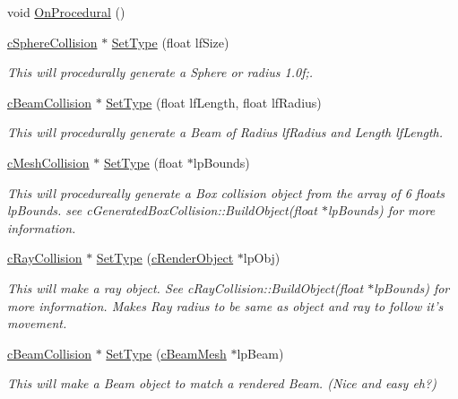 \begin{DoxyCompactItemize}
void \hyperlink{classc_collision_object_a6ea3e10f69f7a2d5cae2bd4471461137}{OnProcedural} ()
\item 
\hyperlink{classc_sphere_collision}{cSphereCollision} $\ast$ \hyperlink{classc_collision_object_a22e6f4f5c722b6d45629d92488e5d925}{SetType} (float lfSize)
\begin{DoxyCompactList}\small\item\em This will procedurally generate a Sphere or radius 1.0f;. \item\end{DoxyCompactList}\item 
\hyperlink{classc_beam_collision}{cBeamCollision} $\ast$ \hyperlink{classc_collision_object_ab5fc1f36d50ea87a69b4879076a92533}{SetType} (float lfLength, float lfRadius)
\begin{DoxyCompactList}\small\item\em This will procedurally generate a Beam of Radius lfRadius and Length lfLength. \item\end{DoxyCompactList}\item 
\hyperlink{classc_mesh_collision}{cMeshCollision} $\ast$ \hyperlink{classc_collision_object_a40b80411356222997bb94fae10796c93}{SetType} (float $\ast$lpBounds)
\begin{DoxyCompactList}\small\item\em This will procedureally generate a Box collision object from the array of 6 floats lpBounds. see cGeneratedBoxCollision::BuildObject(float $\ast$lpBounds) for more information. \item\end{DoxyCompactList}\item 
\hyperlink{classc_ray_collision}{cRayCollision} $\ast$ \hyperlink{classc_collision_object_a761dae3de0ea58d4d60b98348177b7ed}{SetType} (\hyperlink{classc_render_object}{cRenderObject} $\ast$lpObj)
\begin{DoxyCompactList}\small\item\em This will make a ray object. See cRayCollision::BuildObject(float $\ast$lpBounds) for more information. Makes Ray radius to be same as object and ray to follow it's movement. \item\end{DoxyCompactList}\item 
\hyperlink{classc_beam_collision}{cBeamCollision} $\ast$ \hyperlink{classc_collision_object_a0d08a63b8b7a3bcf6eb1c6617ec71e91}{SetType} (\hyperlink{classc_beam_mesh}{cBeamMesh} $\ast$lpBeam)
\begin{DoxyCompactList}\small\item\em This will make a Beam object to match a rendered Beam. (Nice and easy eh?) \item\end{DoxyCompactList}\item 

\end{DoxyCompactItemize}
